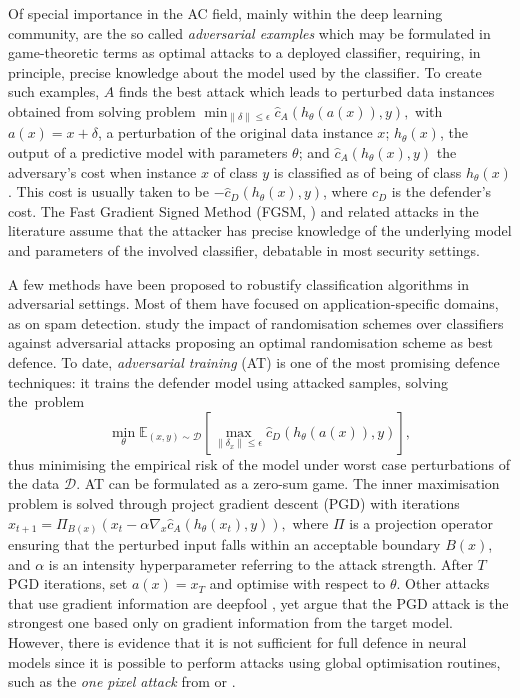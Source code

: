 Of special importance in the AC field, mainly 
within the deep learning community, are the so called {\em adversarial 
examples} \parencite{goodfellow2014explaining} which may be formulated in game-theoretic terms as 
optimal attacks to a deployed classifier, requiring, in principle,
precise knowledge about the model used by the classifier.
To create such examples, $A$ finds the best attack which 
leads to perturbed data instances obtained from solving
problem   
$
\min_{\| \delta \| \leq \epsilon} \widehat{c}_A(h_{\theta} (a(x)), y),
$
 with $a(x) = x + \delta$, a  perturbation of the original data instance $x$; 
$h_{\theta} (x)$, the output of a predictive model with parameters $\theta$;
and
$\widehat{c}_A(h_{\theta} (x), y)$ the adversary's cost when instance $x$ of class $y$ is classified as of being of  class $h_\theta (x)$. This cost is usually taken to be $-\widehat{c}_D(h_{\theta} (x), y)$, where $c_D$ is the defender's cost.
The Fast Gradient Signed Method  (FGSM, \parencite{goodfellow2014explaining}) and related attacks in the literature \parencite{vorobeichikantar} assume that the attacker
has precise knowledge of the underlying model and parameters of the involved classifier, 
  debatable in most security settings.

A few methods have been proposed to robustify classification algorithms in adversarial settings. Most of them have focused on application-specific domains, as \parencite{Kocz2009FeatureWF} on spam detection. \parencite{Vorobeychik:2014:ORC:2615731.2615811} study the impact of randomisation schemes over classifiers against adversarial attacks proposing an optimal randomisation scheme as best defence.
 To date, 
\emph{adversarial training} (AT) \parencite{madry2018towards}
is one of the most promising defence techniques:
 it trains the defender model using attacked samples,
solving the~problem
%
\begin{equation*}
    \min_{\theta} \mathbb{E}_{(x,y) \sim \mathcal{D}} \left[ \max_{\| \delta_x \| \leq \epsilon} \widehat{c}_D(h_{\theta} (a(x)), y) \right],
\end{equation*}
%
thus minimising the empirical risk of the model under worst case perturbations of the data $\mathcal{D}$.
AT can be formulated as a zero-sum game. The inner maximisation problem is solved through project gradient descent (PGD) with iterations 
$
x_{t+1} = \Pi_{B(x)} (x_t - \alpha \nabla_x  \widehat{c}_A(h_{\theta} (x_t), y)),
$
where $\Pi$ is a projection operator ensuring that the perturbed input falls within an acceptable boundary $B(x)$,  and $\alpha$ is an intensity hyperparameter referring to the attack strength. After $T$ PGD iterations, set $a(x) = x_T$ and optimise with respect to $\theta$.   Other attacks that use gradient information are deepfool \parencite{moosavi2016deepfool}, yet \parencite{madry2018towards} argue that the PGD attack is the strongest one based only on gradient information from the target model. However, there is evidence that it is not sufficient for full defence in neural models since it is possible to perform attacks using global optimisation routines, such as the \emph{one pixel attack} from \parencite{su2019one} or \parencite{gowal2018ibp}.%


